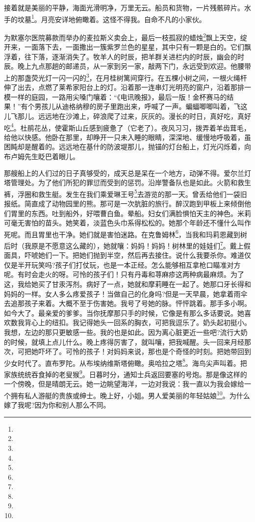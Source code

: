 \par 接着就是美丽的平静，海面光滑明净，万里无云。船员和货物，一片残骸碎片。水手的坟墓\footnote{}。月亮安详地俯瞰着。这怪不得我。自命不凡的小家伙。
\par 为默塞尔医院募款而举办的麦拉斯义卖会上，最后一枝孤寂的蜡烛\footnote{}飘上天空，绽开来，一面落下去，一面撒出一簇紫罗兰色的星星，其中只有一颗是白的。它们飘浮着，往下落，逐渐消失了。牧羊人的时辰，把羊群关进栏内的时辰，幽会的时辰。晚上九点那趟的邮递员，从一家到另一家，敲两下门，永远受到欢迎。他腰带上的那盏荧光灯一闪一闪的\footnote{}，在月桂树篱间穿行。在五棵小树之间，一根火绳杆伸了出去，点燃了莱希家阳台上的灯。沿着那一连串灯光明亮的窗户，沿着那排一模一样的庭园，一路用尖嗓门嚷着：“《电讯晚报》，最后一版！金杯赛马的结果！”有个男孩儿从迪格纳穆的房子里跑出来，呼喊了一声。蝙蝠唧唧叫着，飞这儿飞那儿。远远地在沙滩上，碎浪爬了过来，灰灰的。漫长的时日，真好吃，真好吃\footnote{}。杜鹃花丛，使霍斯山丘感到疲惫了（它老了）。夜风习习，拨弄着羊齿茸毛，给他以快感。他卧在那里，却睁开一只未入睡的眼睛，深深地、缓慢地呼吸着，虽困盹却是醒着的。远远地在基什的防波堤那儿，抛锚的灯台船上，灯光闪烁着，向布卢姆先生眨巴着眼儿。
\par 那艘船上的人们过的日子真够受的，成天总是呆在一个地方，动弹不得。爱尔兰灯塔管理处。为了他们所犯的罪愆而受到的惩罚。沿岸警备队也是如此。火箭和救生裤，浮圈和救生艇。发生在我们乘爱琳王号\footnote{}去游览的那一天。曾丢给他们一袋旧报纸。简直成了动物园里的熊。那可是一次肮脏的旅行。醉汉跑到甲板上来倾倒他们胃里的东西。吐到船外，好喂曹白鱼。晕船。妇女们满脸惧怕天主的神色。米莉可毫无害怕的苗头。她笑着，淡蓝色头巾系得松松的。她那个年龄还不懂什么叫作死呢。而且胃里也干净。她们就是害怕迷路。在克鲁姆林\footnote{}，当我和玛莉恩藏到树后时（我原是不愿意这么藏的），她就嚷：妈妈！妈妈！树林里的娃娃们\footnote{}。戴上假面具，吓唬她们一下。把她们抛到半空，然后再去接住。说什么我要杀你。难道仅仅是半开玩笑吗?孩子们打仗玩，也是一本正经。怎么能够相互拿枪口瞄准对方呢。有时会走火的呀。可怜的孩子们！只有丹毒和荨麻疹这两种病最麻烦。为了这，我给她买了甘汞泻剂。病好了一点，她就和摩莉睡在一起了。她那口牙长得和妈妈的一样。女人多么疼爱孩子！当做自己的化身吗?但是一天早晨，她拿着雨伞去追那孩子来着。大概不至于伤害她。我号了号她的脉。怦怦跳着。那手多小啊。如今大了。最亲爱的爹爹。当你抚摩那只手的时候，它像是有那么多话要说。她喜欢数我背心上的纽扣。我记得她头一回系的胸衣，可把我逗乐了。奶头起初挺小。我想，左边的那只更敏感一些。我的也是如此。因为离心脏更近一些吧?流行大奶的时候，就填上点儿什么。晚上疼得厉害了，就叫嚷，把我喊醒。头一回来月经那次，可把她吓坏了。可怜的孩子！对妈妈来说，那也是个奇怪的时刻。把她带回到少女时代了。直布罗陀。从布埃纳维斯塔俯瞰。奥哈拉之塔\footnote{}。海鸟尖声叫着。把家族统统吞食掉的老叟猴\footnote{}。日暮时分，通知士兵返回要塞的号炮。那是像这样的一个傍晚，但是晴朗无云。她一边眺望海洋，一边对我说：我一直以为我会嫁给一个拥有私人游艇的贵族或绅士。晚上好，小姐。男人爱美丽的年轻姑娘\footnote{}。为什么嫁了我呢?因为你和别人那么不同。
